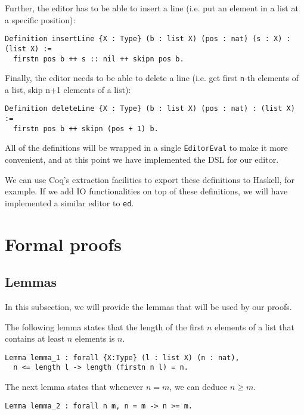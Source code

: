 \documentclass{article}
\theoremstyle{definition}
\begin{document}
Further, the editor has to be able to insert a line (i.e. put an element in a list at a specific position):

\begin{lstlisting}
Definition insertLine {X : Type} (b : list X) (pos : nat) (s : X) : (list X) :=
  firstn pos b ++ s :: nil ++ skipn pos b.
\end{lstlisting}

Finally, the editor needs to be able to delete a line (i.e. get first \texttt{n}-th elements of a list, skip n+1 elements of a list):

\begin{lstlisting}
Definition deleteLine {X : Type} (b : list X) (pos : nat) : (list X) :=
  firstn pos b ++ skipn (pos + 1) b.
\end{lstlisting}

All of the definitions will be wrapped in a single \texttt{EditorEval} to make it more convenient, and at this point we have implemented the DSL for our editor.

We can use Coq's extraction facilities to export these definitions to Haskell, for example. If we add IO functionalities on top of these definitions, we will have implemented a similar editor to \texttt{ed}.

\section{Formal proofs}

\subsection{Lemmas}

In this subsection, we will provide the lemmas that will be used by our proofs.

The following lemma states that the length of the first \(n\) elements of a list that contains at least \(n\) elements is \(n\).

\begin{lstlisting}
Lemma lemma_1 : forall {X:Type} (l : list X) (n : nat),
  n <= length l -> length (firstn n l) = n.
\end{lstlisting}

The next lemma states that whenever \(n = m\), we can deduce \(n \geq m\).

\begin{lstlisting}
Lemma lemma_2 : forall n m, n = m -> n >= m.
\end{lstlisting}
\end{document}
